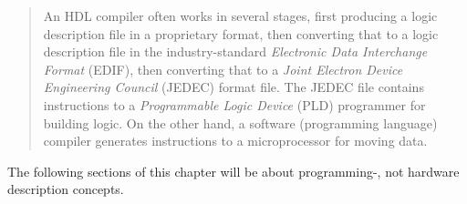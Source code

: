 \begin{quote}
    An HDL compiler often works in several stages, first producing a logic
    description file in a proprietary format, then converting that to a logic
    description file in the industry-standard
    \emph{Electronic Data Interchange Format} (EDIF), then converting that to a
    \emph{Joint Electron Device Engineering Council} (JEDEC) format file. The
    JEDEC file contains instructions to a \emph{Programmable Logic Device} (PLD)
    programmer for building logic. On the other hand, a software (programming
    language) compiler generates instructions to a microprocessor for moving data.
\end{quote}

The following sections of this chapter will be about programming-, not hardware
description concepts.

